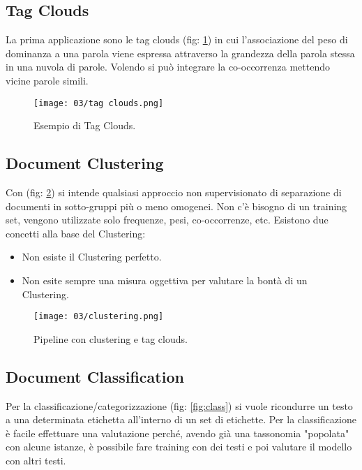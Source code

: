 \subsection{Tag Clouds}

La prima applicazione sono le tag clouds (fig: \ref{fig:tag}) in cui l'associazione del peso di dominanza a una parola viene espressa attraverso la grandezza della parola stessa in una nuvola di parole. Volendo si può integrare la co-occorrenza mettendo vicine parole simili.
\begin{figure}[h]
    \centering
    \texttt{[image: 03/tag clouds.png]}
    \caption{Esempio di Tag Clouds.}
    \label{fig:tag}
\end{figure}



\subsection{Document Clustering}

Con  (fig: \ref{fig:tag2}) si intende qualsiasi approccio non supervisionato di separazione di documenti in sotto-gruppi più o meno omogenei. Non c'è bisogno di un training set, vengono utilizzate solo frequenze, pesi, co-occorrenze, etc. Esistono due concetti alla base del Clustering:

\begin{itemize}
  \item Non esiste il Clustering perfetto. 
  \item Non esite sempre una misura oggettiva per valutare la bontà di un Clustering.
\end{itemize}

\begin{figure}[h]
    \centering
    \texttt{[image: 03/clustering.png]}
    \caption{Pipeline con clustering e tag clouds.}
    \label{fig:tag2}
\end{figure}

\subsection{Document Classification}

Per la classificazione/categorizzazione (fig: \ref{fig:class}) si vuole ricondurre un testo a una determinata etichetta all'interno di un set di etichette. Per la classificazione è facile effettuare una valutazione perché, avendo già una tassonomia "popolata" con alcune istanze, è possibile fare training con dei testi e poi valutare il modello con altri testi. 

